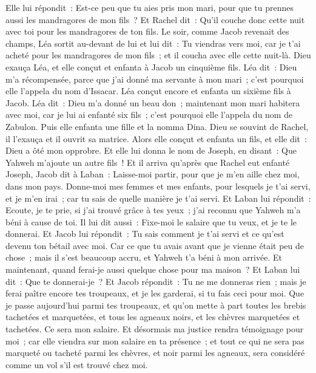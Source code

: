 \begin{multicols}{2}
Elle lui répondit~: Est-ce peu que tu aies pris mon mari, pour que tu prennes aussi les mandragores de mon fils~? Et Rachel dit~: Qu'il couche donc cette nuit avec toi pour les mandragores de ton fils.
Le soir, comme Jacob revenait des champs, Léa sortit au-devant de lui et lui dit~: Tu viendras vers moi, car je t'ai acheté pour les mandragores de mon fils~; et il coucha avec elle cette nuit-là.
Dieu exauça Léa, et elle conçut et enfanta à Jacob un cinquième fils.
Léa dit~: Dieu m'a récompensée, parce que j'ai donné ma servante à mon mari~; c'est pourquoi elle l'appela du nom d'Issacar.
Léa conçut encore et enfanta un sixième fils à Jacob.
Léa dit~: Dieu m'a donné un beau don~; maintenant mon mari habitera avec moi, car je lui ai enfanté six fils~; c'est pourquoi elle l'appela du nom de Zabulon.
Puis elle enfanta une fille et la nomma Dina.
Dieu se souvint de Rachel, il l'exauça et il ouvrit sa matrice.
Alors elle conçut et enfanta un fils, et elle dit~: Dieu a ôté mon opprobre.
Et elle lui donna le nom de Joseph, en disant~: Que Yahweh m'ajoute un autre fils~!
Et il arriva qu'après que Rachel eut enfanté Joseph, Jacob dit à Laban~: Laisse-moi partir, pour que je m'en aille chez moi, dans mon pays.
Donne-moi mes femmes et mes enfants, pour lesquels je t'ai servi, et je m'en irai~; car tu sais de quelle manière je t'ai servi.
Et Laban lui répondit~: Ecoute, je te prie, si j'ai trouvé grâce à tes yeux~; j'ai reconnu que Yahweh m'a béni à cause de toi.
Il lui dit aussi~: Fixe-moi le salaire que tu veux, et je te le donnerai.
Et Jacob lui répondit~: Tu sais comment je t'ai servi et ce qu'est devenu ton bétail avec moi.
Car ce que tu avais avant que je vienne était peu de chose~; mais il s'est beaucoup accru, et Yahweh t'a béni à mon arrivée. Et maintenant, quand ferai-je aussi quelque chose pour ma maison~?
Et Laban lui dit~: Que te donnerai-je~? Et Jacob répondit~: Tu ne me donneras rien~; mais je ferai paître encore tes troupeaux, et je les garderai, si tu fais ceci pour moi.
Que je passe aujourd'hui parmi tes troupeaux, et qu'on mette à part toutes les brebis tachetées et marquetées, et tous les agneaux noirs, et les chèvres marquetées et tachetées. Ce sera mon salaire.
Et désormais ma justice rendra témoignage pour moi~; car elle viendra sur mon salaire en ta présence~; et tout ce qui ne sera pas marqueté ou tacheté parmi les chèvres, et noir parmi les agneaux, sera considéré comme un vol s'il est trouvé chez moi.

\end{multicols}
